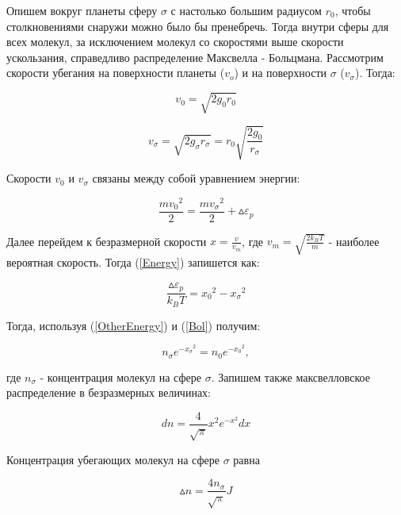 \documentclass[a4paper,12pt]{article}
\begin{document}
Опишем вокруг планеты сферу $\sigma$ с настолько большим радиусом $r_0$, чтобы столкновениями снаружи можно было бы пренебречь. Тогда внутри сферы для всех молекул, за исключением молекул со скоростями выше скорости ускользания, справедливо распределение Максвелла - Больцмана. Рассмотрим скорости убегания на поверхности планеты ($v_o$) и на поверхности $\sigma$ ($v_{\sigma}$). Тогда:

\begin{equation}\label{EarthSpeed}
	v_0 = \sqrt{2g_0r_0}
\end{equation}

\begin{equation}\label{SigmaSpeed}
	v_{\sigma} = \sqrt{2g_{\sigma}r_{\sigma}} = r_0 \sqrt{\frac{2g_0}{r_{\sigma}}}
\end{equation}

Скорости $v_0$ и $v_{\sigma}$ связаны между собой уравнением энергии:

\begin{equation}\label{Energy}
	\frac{m{v_0}^2}{2} = \frac{m{v_{\sigma}}^2}{2} + \vartriangle\varepsilon_p
\end{equation}

Далее перейдем к безразмерной скорости $x = \frac{v}{v_m}$, где $v_m = \sqrt{\frac{2k_BT}{m}}$ - наиболее вероятная скорость. Тогда (\ref{Energy}) запишется как:

\begin{equation}\label{OtherEnergy}
	\frac{\vartriangle\varepsilon_p}{k_BT} = {x_0}^2 - {x_{\sigma}}^2
\end{equation}

Тогда, используя (\ref{OtherEnergy}) и (\ref{Bol}) получим:

\begin{equation}\label{concentration}
	n_{\sigma}e^{-{x_{\sigma}}^2} = n_0e^{-{x_0}^2},
\end{equation}

где $n_{\sigma}$ - концентрация молекул на сфере $\sigma$. Запишем также максвелловское распределение в безразмерных величинах:

\begin{equation}\label{Maksvell}
	dn = \frac{4}{\sqrt{\pi}}x^2e^{-x^2}dx
\end{equation}

Концентрация убегающих молекул на сфере $\sigma$ равна

\begin{equation}\label{SigmaConcentration}
	\vartriangle n = \frac{4n_{\sigma}}{\sqrt{\pi}}J
\end{equation}
\end{document}
